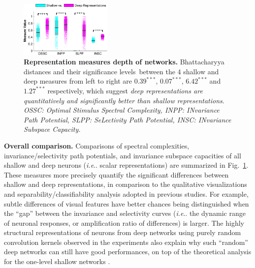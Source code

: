 \documentclass[fleqn]{article} %
\makeatletter
\DeclareRobustCommand\onedot{\futurelet\@let@token\@onedot}
\def\@onedot{\ifx\@let@token.\else.\null\fi\xspace}
\def\ie{\emph{i.e}\onedot} \def\Ie{\emph{I.e}\onedot}
\makeatother
\begin{document}

\begin{figure}
\includegraphics[width=0.40\textwidth]{Figs/s_vs_d.pdf} %
\caption{{\bf Representation measures \vs depth of networks.} %
Bhattacharyya distances and their significance levels\protect\footnotemark~between the 4 shallow and deep measures from left to right are $0.39^{\ast\ast\ast}$, $0.07^{\ast\ast\ast}$, $6.42^{\ast\ast\ast}$ and $1.27^{\ast\ast\ast}$ respectively, which suggest \emph{deep representations are quantitatively and significantly better than shallow representations}. \vspace{2.0ex} \\
\tiny{\textsf{\emph{OSSC: Optimal Stimulus Spectral Complexity, INPP: INvariance Path Potential, SLPP: SeLectivity Path Potential, INSC: INvariance Subspace Capacity.}}}
\vspace{1.5ex}}
\label{fig:pair}
\end{figure}


{\bf Overall comparison.}
Comparisons of spectral complexities, invariance/selectivity path potentials, and invariance subspace capacities of all shallow and deep neurons (\ie scalar representations) are summarized in Fig.~\ref{fig:pair}.
These measures more precisely quantify the significant differences between shallow and deep representations, in comparison to the qualitative visualizations \cite{erhan2010understanding, ngiam2010tiled, zeiler2014visualizing} and separability/classifiability analysis \cite{donahue2014decaf, zeiler2014visualizing} adopted in previous studies.
For example, subtle differences of visual features have better chances being distinguished when the ``gap'' between the invariance and selectivity curves (\ie the dynamic range of neuronal responses, or amplification ratio of differences) is larger.
The highly structural representations of neurons from deep networks using purely random convolution kernels observed in the experiments also explain why such ``random'' deep networks can still have good performances, on top of the theoretical analysis for the one-level shallow networks \cite{saxe2011random}. %
\end{document}
